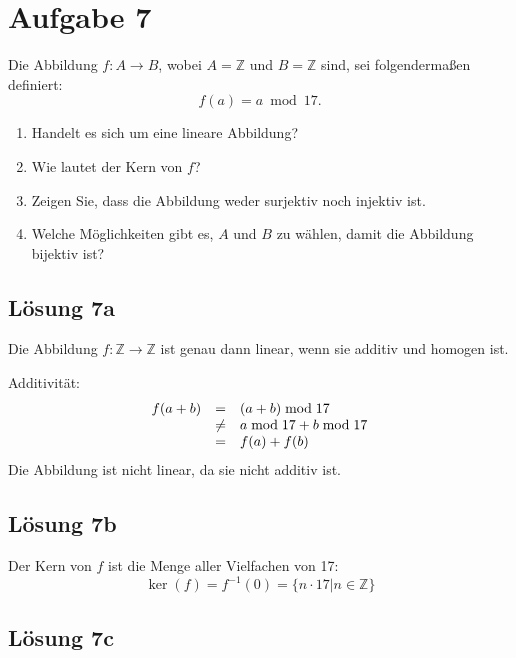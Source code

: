\documentclass[main.tex]{subfiles}
\begin{document}
\section{Aufgabe 7}

Die Abbildung $f:A\rightarrow B$, wobei $A=\mathbb{Z}$ und $B=\mathbb{Z}$ sind, sei folgendermaßen definiert:
\begin{equation*}
    f( a) =a\bmod 17.
\end{equation*}

\begin{enumerate}
    \item Handelt es sich um eine lineare Abbildung?
    \item Wie lautet der Kern von $f$?
    \item Zeigen Sie, dass die Abbildung weder surjektiv noch injektiv ist.
    \item Welche Möglichkeiten gibt es, $A$ und $B$ zu wählen, damit die Abbildung bijektiv ist?
\end{enumerate}

\subsection{Lösung 7a}

Die Abbildung $f:\mathbb{Z}\rightarrow \mathbb{Z}$ ist genau dann linear, wenn sie additiv und homogen ist.

Additivität:
\begin{equation*}
\begin{array}{ r r l }
 f(a+b) & = & (a+b) \bmod 17\\
    & \neq & a \bmod 17 + b \bmod 17\\
    & = & f(a) + f(b)
\end{array}
\end{equation*}
Die Abbildung ist nicht linear, da sie nicht additiv ist.

\subsection{Lösung 7b}
Der Kern von $f$ ist die Menge aller Vielfachen von 17:
\begin{equation*}
    \ker( f) =f^{-1}( 0) =\{n\cdotp 17 | n\in \mathbb{Z}\}
\end{equation*}

\subsection{Lösung 7c}
\end{document}
